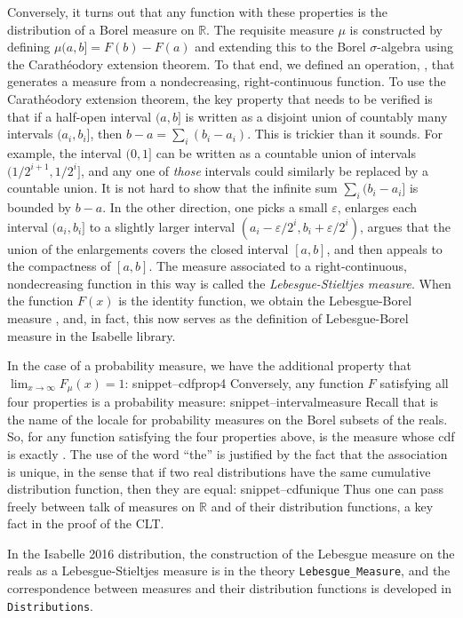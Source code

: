 \documentclass{svjour3}
\newcommand{\RR}{\mathbb{R}}
\newcommand{\Snippet}[1]{\csname snippet--#1\endcsname}
\begin{document}
Conversely, it turns out that any function with these properties is the distribution of a Borel measure on $\RR$. The requisite measure $\mu$ is constructed by defining $\mu (a,b] = F(b) - F(a)$ and extending this to the Borel $\sigma$-algebra using the Carath\'eodory extension theorem. To that end, we defined an operation, , that generates a measure from a nondecreasing, right-continuous function. To use the Carath\'eodory extension theorem, the key property that needs to be verified is that if a half-open interval $(a, b]$ is written as a disjoint union of countably many intervals $(a_i, b_i]$, then $b - a = \sum_i (b_i - a_i)$. This is trickier than it sounds. For example, the interval $(0, 1]$ can be written as a countable union of intervals $(1/2^{i+1}, 1/2^i]$, and any one of \emph{those} intervals could similarly be replaced by a countable union. It is not hard to show that the infinite sum $\sum_i (b_i - a_i]$ is bounded by $b - a$. In the other direction, one picks a small $\varepsilon$, enlarges each interval $(a_i, b_i]$ to a slightly larger interval $(a_i - \varepsilon/2^i, b_i + \varepsilon / 2^i)$, argues that the union of the enlargements covers the closed interval $[a, b]$, and then appeals to the compactness of $[a,b]$. The measure associated to a right-continuous, nondecreasing function in this way is called the \emph{Lebesgue-Stieltjes measure}. When the function $F(x)$ is the identity function, we obtain the Lebesgue-Borel measure , and, in fact, this now serves as the definition of Lebesgue-Borel measure in the Isabelle library.

In the case of a probability measure, we have the additional property that $\lim_{x \rightarrow \infty} F_\mu(x) = 1$:
\Snippet{cdfprop4}
Conversely, any function $F$ satisfying all four properties is a probability measure:
\Snippet{intervalmeasure}
Recall that  is the name of the locale for probability measures on the Borel subsets of the reals. So, for any function  satisfying the four properties above,  is the measure whose cdf is exactly . The use of the word ``the'' is justified by the fact that the association is unique, in the sense that if two real distributions have the same cumulative distribution function, then they are equal:
\Snippet{cdfunique}
Thus one can pass freely between talk of measures on $\RR$ and of their distribution functions, a key fact in the proof of the CLT.

In the Isabelle 2016 distribution, the construction of the Lebesgue measure on the reals as a Lebesgue-Stieltjes measure is in the theory \texttt{Lebesgue\_Measure}, and the correspondence between measures and their distribution functions is developed in \texttt{Distributions}.
\end{document}
